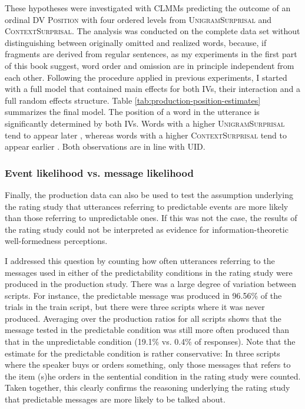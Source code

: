 These hypotheses were investigated with CLMMs predicting the outcome of an ordinal DV \textsc{Position} with four ordered levels from \textsc{UnigramSur\-prisal} and \textsc{ContextSurprisal}. The analysis was conducted on the complete data set without distinguishing between originally omitted and realized words, because, if fragments are derived from regular sentences, as my experiments in the first part of this book suggest, word order and omission are in principle independent from each other. Following the procedure applied in previous experiments, I started with a full model that contained main effects for both IVs, their interaction and a full random effects structure. Table \ref{tab:production-position-estimates} summarizes the final model. The position of a word in the utterance is significantly determined by both IVs. Words with a higher \textsc{UnigramSurprisal} tend to appear later , whereas words with a higher \textsc{ContextSurprisal} tend to appear earlier . Both observations are in line with UID.

\subsubsection{Event likelihood vs. message likelihood}
\label{sec:scripts-production-results-check}
Finally, the production data can also be used to test the assumption underlying the rating study that utterances referring to predictable events are more likely than those referring to unpredictable ones. If this was not the case, the results of the rating study could not be interpreted as evidence for information-theoretic well-formedness perceptions.

I addressed this question by counting how often utterances referring to the messages used in either of the predictability conditions in the rating study were produced in the production study. There was a large degree of variation between scripts. For instance, the predictable message was produced in 96.56\% of the trials in the train script, but there were three scripts where it was never produced. Averaging over the production ratios for all scripts shows that the message tested in the predictable condition was still more often produced than that in the unpredictable condition (19.1\% vs. 0.4\% of responses). Note that the estimate for the predictable condition is rather conservative: In three scripts where the speaker buys or orders something, only those messages that refers to the item (s)he orders in the sentential condition in the rating study were counted. Taken together, this clearly confirms the reasoning underlying the rating study that predictable messages are more likely to be talked about.

